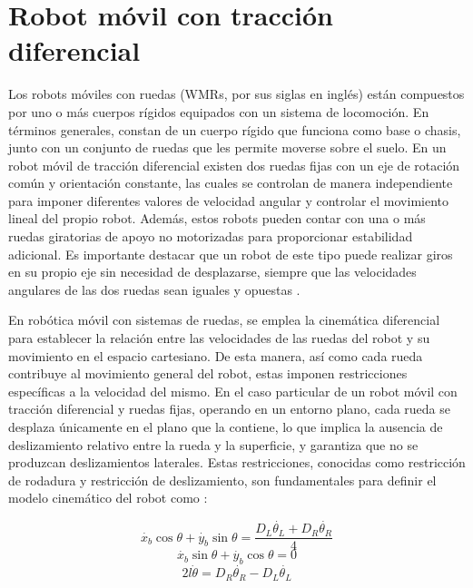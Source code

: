 \section{Robot móvil con tracción diferencial}
Los robots móviles con ruedas (WMRs, por sus siglas en inglés) están compuestos por uno o más cuerpos rígidos equipados con un sistema de locomoción. En términos generales, constan de un cuerpo rígido que funciona como base o chasis, junto con un conjunto de ruedas que les permite moverse sobre el suelo. En un robot móvil de tracción diferencial existen dos ruedas fijas con un eje de rotación común y orientación constante, las cuales se controlan de manera independiente para imponer diferentes valores de velocidad angular y controlar el movimiento lineal del propio robot. Además, estos robots pueden contar con una o más ruedas giratorias de apoyo no motorizadas para proporcionar estabilidad adicional. Es importante destacar que un robot de este tipo puede realizar giros en su propio eje sin necesidad de desplazarse, siempre que las velocidades angulares de las dos ruedas sean iguales y opuestas \cite{siciliano_robotics_2009}. 

En robótica móvil con sistemas de ruedas, se emplea la cinemática diferencial para establecer la relación entre las velocidades de las ruedas del robot y su movimiento en el espacio cartesiano. De esta manera, así como cada rueda contribuye al movimiento general del robot, estas imponen restricciones específicas a la velocidad del mismo. En el caso particular de un robot móvil con tracción diferencial y ruedas fijas, operando en un entorno plano, cada rueda se desplaza únicamente en el plano que la contiene, lo que implica la ausencia de deslizamiento relativo entre la rueda y la superficie, y garantiza que no se produzcan deslizamientos laterales. Estas restricciones, conocidas como restricción de rodadura y restricción de deslizamiento, son fundamentales para definir el modelo cinemático del robot como \cite{multi-robot_nodate}:

\begin{equation}
	\label{eq:mod_cine1}
	\dot{x_b}\cos{\theta}+\dot{y_b}\sin{\theta}=\dfrac{D_{L}\dot{\theta_{L}}+D_{R}\dot{\theta_{R}}}{4}
\end{equation}
\begin{equation}
	\label{eq:mod_cine2}
	\dot{x_b}\sin{\theta}+\dot{y_b}\cos{\theta}=0
\end{equation}
\begin{equation}
	\label{eq:mod_cine3}
	2l\dot{\theta}=D_{R}\dot{\theta_{R}}-D_{L}\dot{\theta_{L}}
\end{equation}

